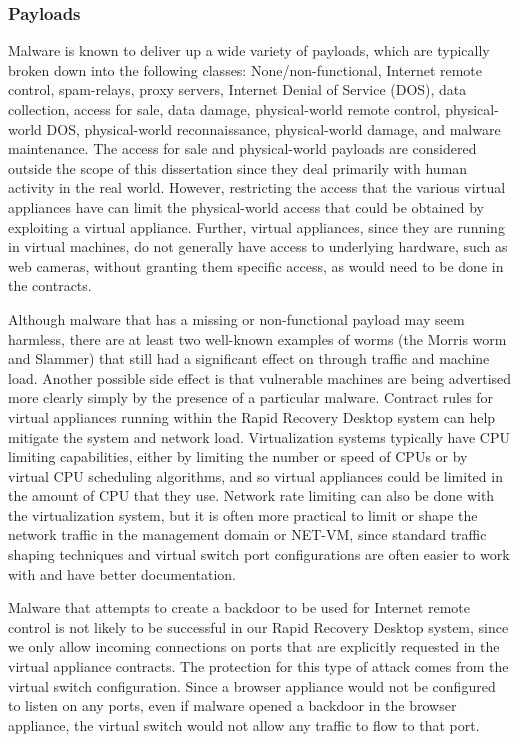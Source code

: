 \subsubsection{Payloads}
\label{sec:payloads}
Malware is known to deliver up a wide variety of payloads, which are typically broken down into the following classes: None/non-functional, Internet remote control, spam-relays, proxy servers, Internet Denial of Service (DOS), data collection, access for sale, data damage, physical-world remote control, physical-world DOS, physical-world reconnaissance, physical-world damage, and malware maintenance. The access for sale and physical-world payloads are considered outside the scope of this dissertation since they deal primarily with human activity in the real world. However, restricting the access that the various virtual appliances have can limit the physical-world access that could be obtained by exploiting a virtual appliance. Further, virtual appliances, since they are running in virtual machines, do not generally have access to underlying hardware, such as web cameras, without granting them specific access, as would need to be done in the contracts.

Although malware that has a missing or non-functional payload may seem harmless, there are at least two well-known examples of worms (the Morris worm\cite{Spafford_1989} and Slammer\cite{slammer_2003}) that still had a significant effect on through traffic and machine load. Another possible side effect is that vulnerable machines are being advertised more clearly simply by the presence of a particular malware. Contract rules for virtual appliances running within the Rapid Recovery Desktop system can help mitigate the system and network load. Virtualization systems typically have CPU limiting capabilities, either by limiting the number or speed of CPUs or by virtual CPU scheduling algorithms, and so virtual appliances could be limited in the amount of CPU that they use. Network rate limiting can also be done with the virtualization system, but it is often more practical to limit or shape the network traffic in the management domain or NET-VM, since standard traffic shaping techniques and virtual switch port configurations are often easier to work with and have better documentation.

Malware that attempts to create a backdoor to be used for Internet remote control is not likely to be successful in our Rapid Recovery Desktop system, since we only allow incoming connections on ports that are explicitly requested in the virtual appliance contracts. The protection for this type of attack comes from the virtual switch configuration. Since a browser appliance would not be configured to listen on any ports, even if malware opened a backdoor in the browser appliance, the virtual switch would not allow any traffic to flow to that port.

